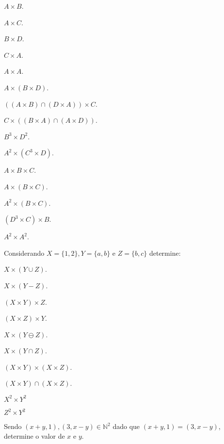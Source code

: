 \begin{exerList}
	\item $A \times B$.
	\item $A \times C$.
	\item $B \times D$.
	\item $C \times A$.
	\item $A \times A$.
	\item $A \times (B \times D)$.
	\item $((A \times B) \cap (D \times A)) \times C$.
	\item $C \times ((B \times A) \cap (A \times D))$.
	\item $B^3 \times D^2$.
	\item $A^2 \times (C^3 \times D)$.
	\item $A \times B \times C$.
	\item $A \times (B \times C)$.
	\item $A^2 \times (B \times C)$.
	\item $(D^3 \times C) \times B$.
	\item $A^2 \times A^2$.
\end{exerList}

\begin{problem}\label{prob:Relacoes2}
	Considerando $X = \{1, 2\}, Y = \{a, b\}$ e $Z = \{b, c\}$ determine:
\end{problem}

\begin{exerList}
	\item $X  \times (Y \cup Z)$.
	\item $X  \times (Y - Z)$.
	\item $(X \times Y) \times Z$.
	\item $(X \times Z) \times Y$.
	\item $X  \times (Y \ominus Z)$.
	\item $X  \times (Y \cap Z)$.
	\item $(X \times Y) \times (X \times Z)$.
	\item $(X \times Y) \cap (X \times Z)$.
	\item $X^2 \times Y^2$
	\item $Z^2 \times Y^2$
\end{exerList}

\begin{problem}\label{prob:Relacoes3}
	Sendo $(x + y, 1), (3, x - y) \in \mathbb{N}^2$ dado que $(x + y, 1) = (3, x - y)$, determine o valor de $x$ e $y$.
\end{problem}

